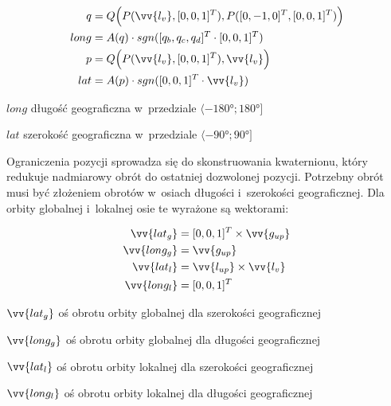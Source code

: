 \begin{samepage}
  \begin{align}
    q &= Q\Big(P(\vv{l_v}, [0, 0, 1]^T), P([0, -1, 0]^T, [0, 0, 1]^T)\Big) \\
    \label{eq:o_11}
    long &= A(q) \cdot sgn([q_b, q_c, q_d]^T \cdot [0, 0, 1]^T) \\
    p &= Q\Big(P(\vv{l_{v}}, [0, 0, 1]^T), \vv{l_{v}}\Big) \\
    \label{eq:o_12}
    lat &= A(p) \cdot sgn([0, 0, 1]^T \cdot \vv{l_{v}})
  \end{align}
\begin{eqexpl}[25mm]
    \item {$long$} długość geograficzna w~przedziale $\langle\ang{-180}; \ang{180}\rbrack$
    \item {$lat$} szerokość geograficzna w~przedziale $\langle\ang{-90}; \ang{90}\rbrack$
\end{eqexpl}
  \vspace{\baselineskip}
\end{samepage}

Ograniczenia pozycji sprowadza się do skonstruowania kwaternionu, który redukuje nadmiarowy obrót do ostatniej dozwolonej pozycji. Potrzebny obrót musi być złożeniem obrotów w~osiach długości i~szerokości geograficznej.
Dla orbity globalnej i~lokalnej osie te wyrażone są wektorami:
\begin{samepage}
  \begin{align}
      \vv{lat_g} &= [0, 0, 1]^T \times \vv{g_{up}} \\
      \vv{long_g} &= \vv{g_{up}} \\
      \vv{lat_l} &= \vv{l_{up}} \times \vv{l_v} \\
      \vv{long_l} &= [0, 0, 1]^T
  \end{align}
  \begin{eqexpl}[25mm]
      \item {$\vv{lat_g}$} oś obrotu orbity globalnej dla szerokości geograficznej
      \item {$\vv{long_g}$} oś obrotu orbity globalnej dla długości geograficznej
      \item {$\vv{lat_l}$} oś obrotu orbity lokalnej dla szerokości geograficznej
      \item {$\vv{long_l}$} oś obrotu orbity lokalnej dla długości geograficznej
  \end{eqexpl}
  \vspace{\baselineskip}
\end{samepage}

